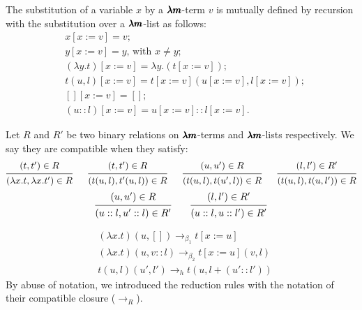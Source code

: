 \begin{definition}
  The substitution of a variable $x$ by a $\LamM$-term $v$ is mutually defined by recursion with the substitution over a $\LamM$-list as follows:  
  \begin{align*}
  & x[x := v] = v ; \\
  & y[x := v] = y \text{, with } x \neq y ; \\
  & (\lambda y . t)[x := v] = \lambda y . (t[x := v]) ; \\
  & t(u, l)[x := v] = t[x := v](u[x := v], l[x := v]) ; \\    
  & [][x := v] = [] ; \\
  & (u::l)[x := v] = u[x := v] :: l[x := v] .
  \end{align*}
\end{definition}

\begin{definition}
  \label{compatible_relation}
  Let $R$ and $R'$ be two binary relations on $\LamM$-terms and $\LamM$-lists respectively.
  We say they are compatible when they satisfy:
  \[
    \begin{prooftree}
      \hypo{ (t, t') \in R }
      \infer1{ (\lambda x . t, \lambda x . t') \in R } 
    \end{prooftree}
    \quad \ \
    \begin{prooftree}
      \hypo{ (t, t') \in R }
      \infer1{ (t(u, l), t'(u, l)) \in R } 
    \end{prooftree}
    \quad \ \
    \begin{prooftree}
      \hypo{ (u, u') \in R }
      \infer1{ (t(u, l), t(u', l)) \in R } 
    \end{prooftree}
    \quad \ \
    \begin{prooftree}
      \hypo{ (l, l') \in R' }
      \infer1{ (t(u, l), t(u, l')) \in R } 
    \end{prooftree}
  \]
  \[
    \begin{prooftree}
      \hypo{ (u, u') \in R }
      \infer1{ (u::l, u'::l) \in R' } 
    \end{prooftree}
    \qquad
    \begin{prooftree}
      \hypo{ (l, l') \in R' }
      \infer1{ (u::l, u::l') \in R' } 
    \end{prooftree}
  \]
\end{definition}

\begin{definition}[Reduction rules for $\LamM$-terms]  
  \begin{align*}
    & (\lambda x . t)(u, []) \to_{\beta_1} t[x := u]
    \\
    & (\lambda x . t)(u, v::l) \to_{\beta_2} t[x := u](v, l)
    \\
    & t(u, l)(u', l') \to_{h} t(u, l + (u'::l'))
  \end{align*}
  By abuse of notation, we introduced the reduction rules with the notation of their compatible closure ($\to_R$).
\end{definition}

